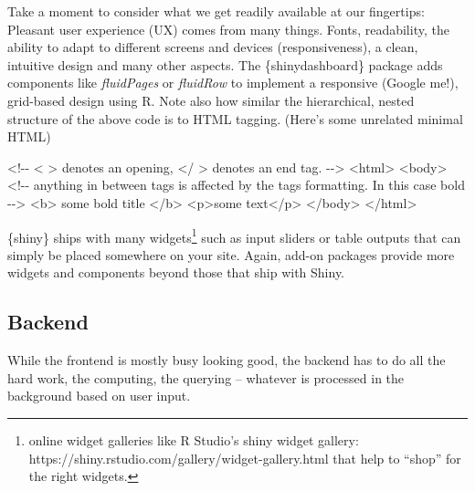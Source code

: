 \documentclass[
  12pt,
  letterpaper,
]{krantz}
\newenvironment{Shaded}{\begin{snugshade}}{\end{snugshade}}
\newcommand{\CommentTok}[1]{\textcolor[rgb]{0.37,0.37,0.37}{#1}}
\newcommand{\KeywordTok}[1]{\textcolor[rgb]{0.00,0.23,0.31}{#1}}
\newcommand{\NormalTok}[1]{\textcolor[rgb]{0.00,0.23,0.31}{#1}}
\begin{document}
Take a moment to consider what we get readily available at our
fingertips: Pleasant user experience (UX) comes from many things. Fonts,
readability, the ability to adapt to different screens and devices
(responsiveness), a clean, intuitive design and many other aspects. The
\{shinydashboard\} package adds components like \emph{fluidPages} or
\emph{fluidRow} to implement a responsive (Google me!), grid-based
design using R. Note also how similar the hierarchical,
nested structure of the above code is to
HTML tagging. (Here's some unrelated minimal HTML)

\begin{Shaded}
\begin{Highlighting}[]
\CommentTok{\textless{}!{-}{-} \textless{} \textgreater{} denotes an opening,}
\CommentTok{ \textless{}/ \textgreater{} denotes an end tag. {-}{-}\textgreater{}}
\KeywordTok{\textless{}html\textgreater{}}
  \KeywordTok{\textless{}body\textgreater{}}
  \CommentTok{\textless{}!{-}{-} anything in between tags is affected by}
\CommentTok{       the tags formatting.}
\CommentTok{       In this case bold {-}{-}\textgreater{}}
    \KeywordTok{\textless{}b\textgreater{}}\NormalTok{ some bold title }\KeywordTok{\textless{}/b\textgreater{}}
    \KeywordTok{\textless{}p\textgreater{}}\NormalTok{some text}\KeywordTok{\textless{}/p\textgreater{}}
  \KeywordTok{\textless{}/body\textgreater{}}
\KeywordTok{\textless{}/html\textgreater{}}

\end{Highlighting}
\end{Shaded}

\{shiny\} ships with many widgets\footnote{online widget galleries like
  R Studio's shiny widget gallery:
  https://shiny.rstudio.com/gallery/widget-gallery.html that help to
  ``shop'' for the right widgets.} such as input sliders or table
outputs that can simply be placed somewhere on your site. Again, add-on
packages provide more widgets and components beyond those that ship with
Shiny.

\hypertarget{backend}{%
\subsection{Backend}\label{backend}}

While the frontend is mostly busy looking good, the backend has to do
all the hard work, the computing, the querying -- whatever is processed
in the background based on user input.
\end{document}
